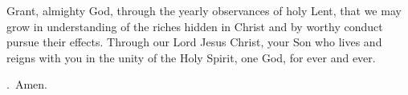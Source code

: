 \lettrine[lines=3]{G}{}rant, almighty God,
through the yearly observances of holy Lent,
that we may grow in understanding
of the riches hidden in Christ
and by worthy conduct pursue their effects.
Through our Lord Jesus Christ, your Son
who lives and reigns with you in the unity of the Holy Spirit,
one God, for ever and ever. \par \Rbar.~Amen.

